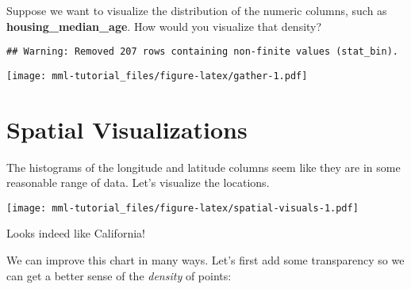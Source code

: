\documentclass[]{book}
\newenvironment{Shaded}{\begin{snugshade}}{\end{snugshade}}
\newcommand{\KeywordTok}[1]{\textcolor[rgb]{0.13,0.29,0.53}{\textbf{#1}}}
\newcommand{\DataTypeTok}[1]{\textcolor[rgb]{0.13,0.29,0.53}{#1}}
\newcommand{\StringTok}[1]{\textcolor[rgb]{0.31,0.60,0.02}{#1}}
\newcommand{\OperatorTok}[1]{\textcolor[rgb]{0.81,0.36,0.00}{\textbf{#1}}}
\newcommand{\NormalTok}[1]{#1}
\theoremstyle{definition}
\theoremstyle{definition}
\theoremstyle{definition}
\theoremstyle{remark}
\begin{document}
Suppose we want to visualize the distribution of the numeric columns,
such as \textbf{housing\_median\_age}. How would you visualize that
density?

\begin{Shaded}
\end{Shaded}

\begin{verbatim}
## Warning: Removed 207 rows containing non-finite values (stat_bin).
\end{verbatim}

\texttt{[image: mml-tutorial\_files/figure-latex/gather-1.pdf]}

\section{Spatial Visualizations}\label{spatial-visualizations}

The histograms of the longitude and latitude columns seem like they are
in some reasonable range of data. Let's visualize the locations.

\begin{Shaded}
\end{Shaded}

\texttt{[image: mml-tutorial\_files/figure-latex/spatial-visuals-1.pdf]}

Looks indeed like California!

We can improve this chart in many ways. Let's first add some
transparency so we can get a better sense of the \emph{density} of
points:
\end{document}
